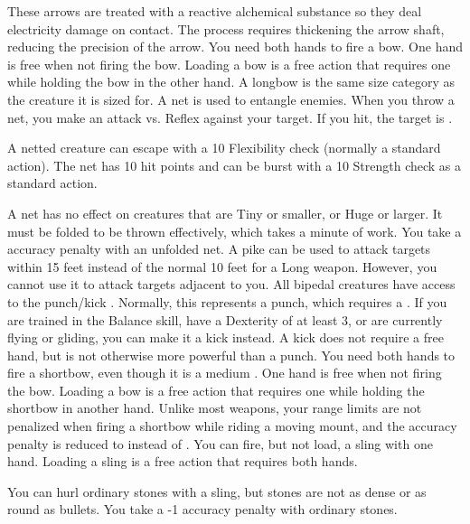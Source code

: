          These arrows are treated with a reactive alchemical substance so they deal electricity damage on contact.
        The process requires thickening the arrow shaft, reducing the precision of the arrow.
         You need both hands to fire a bow. One hand is free when not firing the bow. Loading a bow is a free action that requires one  while holding the bow in the other hand.
        A longbow is the same size category as the creature it is sized for.
         A net is used to entangle enemies. When you throw a net, you make an attack vs. Reflex against your target. If you hit, the target is \slowed.
        \par A netted creature can escape with a  10 Flexibility check (normally a standard action). The net has 10 hit points and can be burst with a  10 Strength check as a standard action.
        \par A net has no effect on creatures that are Tiny or smaller, or Huge or larger. It must be folded to be thrown effectively, which takes a minute of work. You take a  accuracy penalty with an unfolded net.
         A pike can be used to attack targets within 15 feet instead of the normal 10 feet for a Long weapon.
        However, you cannot use it to attack targets adjacent to you.
         All bipedal creatures have access to the punch/kick .
        Normally, this represents a punch, which requires a .
        If you are trained in the Balance skill, have a Dexterity of at least 3, or are currently flying or gliding, you can make it a kick instead.
        A kick does not require a free hand, but is not otherwise more powerful than a punch.
         You need both hands to fire a shortbow, even though it is a medium . One hand is free when not firing the bow. Loading a bow is a free action that requires one  while holding the shortbow in another hand.
        Unlike most  weapons, your range limits are not penalized when firing a shortbow while riding a moving mount, and the accuracy penalty is reduced to  instead of .
         You can fire, but not load, a sling with one hand. Loading a sling is a free action that requires both hands.
        \par You can hurl ordinary stones with a sling, but stones are not as dense or as round as bullets. You take a -1 accuracy penalty with ordinary stones.

